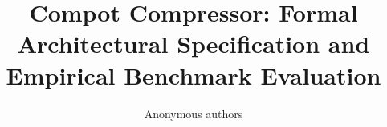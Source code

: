 \title{\textbf{Compot Compressor: Formal Architectural Specification and Empirical Benchmark Evaluation}}

\author{Anonymous authors}
